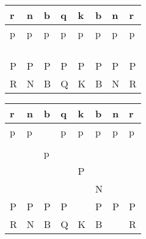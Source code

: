 \documentclass{article}
\begin{document}
\maketitle
\clearpage


\begin{center}\begin{tabular}{|l|l|l|l|l|l|l|l|}
\hline r & n & b & q & k & b & n & r \\
\hline p & p & p & p & p & p & p & p \\
\hline  &  &  &  &  &  &  &  \\
\hline  &  &  &  &  &  &  &  \\
\hline  &  &  &  &  &  &  &  \\
\hline  &  &  &  &  &  &  &  \\
\hline P & P & P & P & P & P & P & P \\
\hline R & N & B & Q & K & B & N & R \\
\hline \end{tabular}\end{center}

\begin{center}\begin{tabular}{|l|l|l|l|l|l|l|l|}
\hline r & n & b & q & k & b & n & r \\
\hline p & p &  & p & p & p & p & p \\
\hline  &  &  &  &  &  &  &  \\
\hline  &  & p &  &  &  &  &  \\
\hline  &  &  &  & P &  &  &  \\
\hline  &  &  &  &  & N &  &  \\
\hline P & P & P & P &  & P & P & P \\
\hline R & N & B & Q & K & B &  & R \\
\hline \end{tabular}\end{center}

\end{document}
